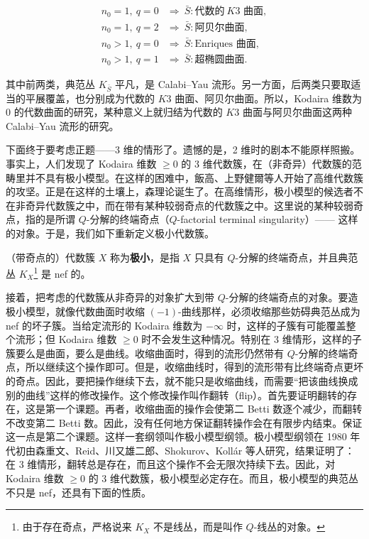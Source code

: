 \[
\begin{array}{ll}
n_0 = 1,\ q = 0 & \Longrightarrow\ \bar{S} : \text{代数的}\ K3\text{ 曲面},\\
n_0 = 1,\ q = 2 & \Longrightarrow\ \bar{S} : \text{阿贝尔曲面},\\
n_0 > 1,\ q = 0 & \Longrightarrow\ \bar{S} : \text{Enriques 曲面},\\
n_0 > 1,\ q = 1 & \Longrightarrow\ \bar{S} : \text{超椭圆曲面}.
\end{array}
\]

其中前两类，典范丛 $K_{\bar{S}}$ 平凡，是 Calabi--Yau 流形。另一方面，后两类只要取适当的平展覆盖，也分别成为代数的 $K3$ 曲面、阿贝尔曲面。所以，Kodaira 维数为 0 的代数曲面的研究，某种意义上就归结为代数的 $K3$ 曲面与阿贝尔曲面这两种 Calabi--Yau 流形的研究。

下面终于要考虑正题——3 维的情形了。遗憾的是，2 维时的剧本不能原样照搬。事实上，人们发现了 Kodaira 维数 $\ge 0$ 的 3 维代数簇，在（非奇异）代数簇的范畴里并不具有极小模型。在这样的困难中，飯高、上野健爾等人开始了高维代数簇的攻坚。正是在这样的土壤上，森理论诞生了。在高维情形，极小模型的候选者不在非奇异代数簇之中，而在带有某种较弱奇点的代数簇之中。这里说的某种较弱奇点，指的是所谓 $Q$-分解的终端奇点（$Q$-factorial terminal singularity）——
这样的对象。于是，我们如下重新定义极小代数簇。

\begin{center}
（带奇点的）代数簇 $X$ 称为\textbf{极小}，是指 $X$ 只具有 $Q$-分解的终端奇点，并且典范丛 $K_X$\footnote{由于存在奇点，严格说来 $K_X$ 不是线丛，而是叫作 $Q$-线丛的对象。} 是 nef 的。
\end{center}

接着，把考虑的代数簇从非奇异的对象扩大到带 $Q$-分解的终端奇点的对象。要造极小模型，就像代数曲面时收缩 $(-1)$-曲线那样，必须收缩那些妨碍典范丛成为 nef 的坏子簇。当给定流形的 Kodaira 维数为 $-\infty$ 时，这样的子簇有可能覆盖整个流形；但 Kodaira 维数 $\ge 0$ 时不会发生这种情况。特别在 3 维情形，这样的子簇要么是曲面，要么是曲线。收缩曲面时，得到的流形仍然带有 $Q$-分解的终端奇点，所以继续这个操作即可。但是，收缩曲线时，得到的流形带有比终端奇点更坏的奇点。因此，要把操作继续下去，就不能只是收缩曲线，而需要“把该曲线换成别的曲线”这样的修改操作。这个修改操作叫作翻转（flip）。首先要证明翻转的存在，这是第一个课题。再者，收缩曲面的操作会使第二 Betti 数逐个减少，而翻转不改变第二 Betti 数。因此，没有任何地方保证翻转操作会在有限步内结束。保证这一点是第二个课题。这样一套纲领叫作极小模型纲领。极小模型纲领在 1980 年代初由森重文、Reid、川又雄二郎、Shokurov、Kollár 等人研究，结果证明了：在 3 维情形，翻转总是存在，而且这个操作不会无限次持续下去。因此，对 Kodaira 维数 $\ge 0$ 的 3 维代数簇，极小模型必定存在。而且，极小模型的典范丛不只是 nef，还具有下面的性质。

